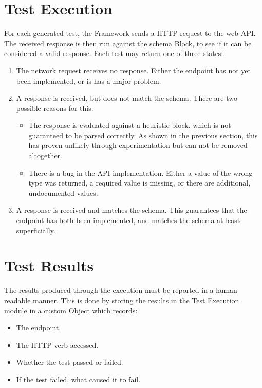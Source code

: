 \section{Test Execution}

For each generated test, the Framework sends a HTTP request to the web API. The received response is then run against the schema Block, to see if it can be considered a valid response. Each test may return one of three states:

\begin{enumerate}
\item The network request receives no response. Either the endpoint has not yet been implemented, or is has a major problem.
\item A response is received, but does not match the schema. There are two possible reasons for this:
    \begin{itemize}
    \item The response is evaluated against a heuristic block. which is not guaranteed to be parsed correctly. As shown in the previous section, this has proven unlikely through experimentation but can not be removed altogether.
    \item There is a bug in the API implementation. Either a value of the wrong type was returned, a required value is missing, or there are additional, undocumented values.
    \end{itemize}
\item A response is received and matches the schema. This guarantees that the endpoint has both been implemented, and matches the schema at least superficially.
\end{enumerate}

\section{Test Results}

The results produced through the execution must be reported in a human readable manner. This is done by storing the results in the Test Execution module in a custom Object which records:

\begin{itemize}
\item The endpoint.
\item The HTTP verb accessed.
\item Whether the test passed or failed. 
\item If the test failed, what caused it to fail.
\end{itemize}

